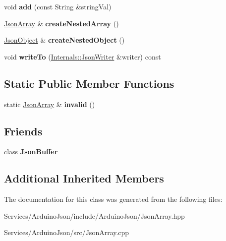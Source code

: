 \begin{DoxyCompactItemize}
\item 
\hypertarget{class_arduino_json_1_1_json_array_acc8516b47020fe7f12028f5d29a327dd}{}void {\bfseries add} (const String \&string\+Val)\label{class_arduino_json_1_1_json_array_acc8516b47020fe7f12028f5d29a327dd}

\item 
\hypertarget{class_arduino_json_1_1_json_array_ae835359973b4efb09b6b18eccd8848f5}{}\hyperlink{class_arduino_json_1_1_json_array}{Json\+Array} \& {\bfseries create\+Nested\+Array} ()\label{class_arduino_json_1_1_json_array_ae835359973b4efb09b6b18eccd8848f5}

\item 
\hypertarget{class_arduino_json_1_1_json_array_aff022ed8518977c6dd9cf4251934c611}{}\hyperlink{class_arduino_json_1_1_json_object}{Json\+Object} \& {\bfseries create\+Nested\+Object} ()\label{class_arduino_json_1_1_json_array_aff022ed8518977c6dd9cf4251934c611}

\item 
\hypertarget{class_arduino_json_1_1_json_array_a92e011c1f231a216d32638bf0d172fe6}{}void {\bfseries write\+To} (\hyperlink{class_arduino_json_1_1_internals_1_1_json_writer}{Internals\+::\+Json\+Writer} \&writer) const \label{class_arduino_json_1_1_json_array_a92e011c1f231a216d32638bf0d172fe6}

\end{DoxyCompactItemize}
\subsection*{Static Public Member Functions}
\begin{DoxyCompactItemize}
\item 
\hypertarget{class_arduino_json_1_1_json_array_aa4d2a01145e33b5ee0c16c6b566fa08f}{}static \hyperlink{class_arduino_json_1_1_json_array}{Json\+Array} \& {\bfseries invalid} ()\label{class_arduino_json_1_1_json_array_aa4d2a01145e33b5ee0c16c6b566fa08f}

\end{DoxyCompactItemize}
\subsection*{Friends}
\begin{DoxyCompactItemize}
\item 
\hypertarget{class_arduino_json_1_1_json_array_a722362d1283cdffdf5309ff09cc998cd}{}class {\bfseries Json\+Buffer}\label{class_arduino_json_1_1_json_array_a722362d1283cdffdf5309ff09cc998cd}

\end{DoxyCompactItemize}
\subsection*{Additional Inherited Members}


The documentation for this class was generated from the following files\+:\begin{DoxyCompactItemize}
\item 
Services/\+Arduino\+Json/include/\+Arduino\+Json/Json\+Array.\+hpp\item 
Services/\+Arduino\+Json/src/Json\+Array.\+cpp\end{DoxyCompactItemize}
